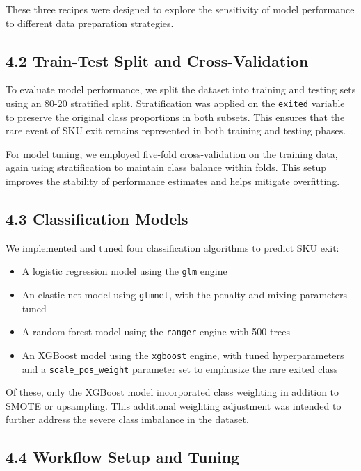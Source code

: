 \documentclass[
  letterpaper,
  DIV=11,
  numbers=noendperiod]{scrartcl}
\providecommand{\tightlist}{%
  \setlength{\itemsep}{0pt}\setlength{\parskip}{0pt}}\usepackage{longtable,booktabs,array}
\begin{document}
These three recipes were designed to explore the sensitivity of model
performance to different data preparation strategies.

\subsection{4.2 Train-Test Split and
Cross-Validation}\label{train-test-split-and-cross-validation}

To evaluate model performance, we split the dataset into training and
testing sets using an 80-20 stratified split. Stratification was applied
on the \texttt{exited} variable to preserve the original class
proportions in both subsets. This ensures that the rare event of SKU
exit remains represented in both training and testing phases.

For model tuning, we employed five-fold cross-validation on the training
data, again using stratification to maintain class balance within folds.
This setup improves the stability of performance estimates and helps
mitigate overfitting.

\subsection{4.3 Classification Models}\label{classification-models}

We implemented and tuned four classification algorithms to predict SKU
exit:

\begin{itemize}
\tightlist
\item
  A logistic regression model using the \texttt{glm} engine
\item
  An elastic net model using \texttt{glmnet}, with the penalty and
  mixing parameters tuned
\item
  A random forest model using the \texttt{ranger} engine with 500 trees
\item
  An XGBoost model using the \texttt{xgboost} engine, with tuned
  hyperparameters and a \texttt{scale\_pos\_weight} parameter set to
  emphasize the rare exited class
\end{itemize}

Of these, only the XGBoost model incorporated class weighting in
addition to SMOTE or upsampling. This additional weighting adjustment
was intended to further address the severe class imbalance in the
dataset.

\subsection{4.4 Workflow Setup and
Tuning}\label{workflow-setup-and-tuning}
\end{document}
